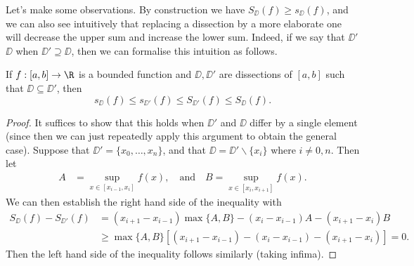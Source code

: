 \begin{center}

\end{center}

Let's make some observations. By construction we have $S_\DD (f) \geq s_\DD(f)$, and we can also see intuitively that replacing a dissection by a more elaborate one will decrease the upper sum and increase the lower sum. Indeed, if we say that $\DD'$  $\DD$ when $\DD' \supseteq \DD$, then we can formalise this intuition as follows.

\begin{lemma}
	If $f: [a, b] \rightarrow \R$ is a bounded function and $\DD, \DD'$ are dissections of $[a, b]$ such that $\DD \subseteq \DD'$, then 
	$$s_\DD(f) \leq s_{\DD'}(f) \leq S_{\DD'}(f) \leq S_{\DD}(f).$$
\end{lemma}
\begin{proof}
	It suffices to show that this holds when $\DD'$ and $\DD$ differ by a single element (since then we can just repeatedly apply this argument to obtain the general case).
	Suppose that $\DD' = \{x_0, \dots, x_n\}$, and that $\DD = \DD' \backslash \{x_i\}$ where $i \neq 0, n$. Then let
	\begin{align*}
		A &= \sup_{x \in [x_{i - 1}, x_i]} f(x), \quad \text{and} \quad B = \sup_{x \in [x_{i}, x_{i+1}]} f(x).
	\end{align*}
	We can then establish the right hand side of the inequality with
	\begin{align*}
		S_{\DD}(f) - S_{\DD'}(f) &= (x_{i+1} - x_{i-1})\max\{A, B\} - (x_{i} - x_{i - 1})A - (x_{i + 1} - x_i)B \\
		&\geq \max\{A, B\}[(x_{i+1} - x_{i-1}) - (x_{i} - x_{i - 1}) - (x_{i + 1} - x_i)] = 0.
	\end{align*}
	Then the left hand side of the inequality follows similarly (taking infima).
\end{proof}

